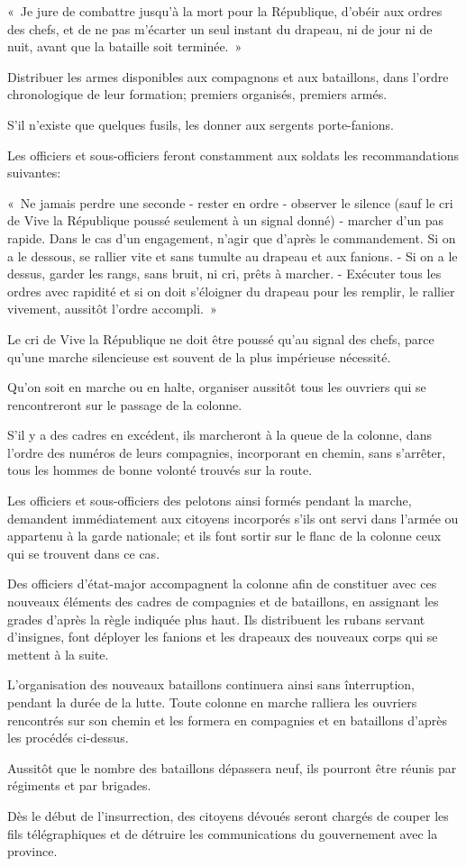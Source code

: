 \documentclass[french,twoside]{book} %
\begin{document}
« Je jure de combattre jusqu’à la mort pour la République, d’obéir aux ordres des chefs, et de ne pas m’écarter un seul instant du drapeau, ni de jour ni de nuit, avant que la bataille soit terminée. »\par
Distribuer les armes disponibles aux compagnons et aux bataillons, dans l’ordre chronologique de leur formation; premiers organisés, premiers armés.\par
S'il n’existe que quelques fusils, les donner aux sergents porte-fanions.\par
Les officiers et sous-officiers feront constamment aux soldats les recommandations suivantes:\par
« Ne jamais perdre une seconde - rester en ordre - observer le silence (sauf le cri de Vive la République poussé seulement à un signal donné) - marcher d’un pas rapide. Dans le cas d’un engagement, n’agir que d’après le commandement. Si on a le dessous, se rallier vite et sans tumulte au drapeau et aux fanions. - Si on a le dessus, garder les rangs, sans bruit, ni cri, prêts à marcher. - Exécuter tous les ordres avec rapidité et si on doit s’éloigner du drapeau pour les remplir, le rallier vivement, aussitôt l’ordre accompli. »\par
Le cri de Vive la République ne doit être poussé qu’au signal des chefs, parce qu’une marche silencieuse est souvent de la plus impérieuse nécessité.\par
Qu'on soit en marche ou en halte, organiser aussitôt tous les ouvriers qui se rencontreront sur le passage de la colonne.\par
S'il y a des cadres en excédent, ils marcheront à la queue de la colonne, dans l’ordre des numéros de leurs compagnies, incorporant en chemin, sans s’arrêter, tous les hommes de bonne volonté trouvés sur la route.\par
Les officiers et sous-officiers des pelotons ainsi formés pendant la marche, demandent immédiatement aux citoyens incorporés s’ils ont servi dans l’armée ou appartenu à la garde nationale; et ils font sortir sur le flanc de la colonne ceux qui se trouvent dans ce cas.\par
Des officiers d’état-major accompagnent la colonne afin de constituer avec ces nouveaux éléments des cadres de compagnies et de bataillons, en assignant les grades d’après la règle indiquée plus haut. Ils distribuent les rubans servant d’insignes, font déployer les fanions et les drapeaux des nouveaux corps qui se mettent à la suite.\par
L'organisation des nouveaux bataillons continuera ainsi sans înterruption, pendant la durée de la lutte. Toute colonne en marche ralliera les ouvriers rencontrés sur son chemin et les formera en compagnies et en bataillons d’après les procédés ci-dessus.\par
Aussitôt que le nombre des bataillons dépassera neuf, ils pourront être réunis par régiments et par brigades.\par
Dès le début de l’insurrection, des citoyens dévoués seront chargés de couper les fils télégraphiques et de détruire les communications du gouvernement avec la province.
\end{document}
